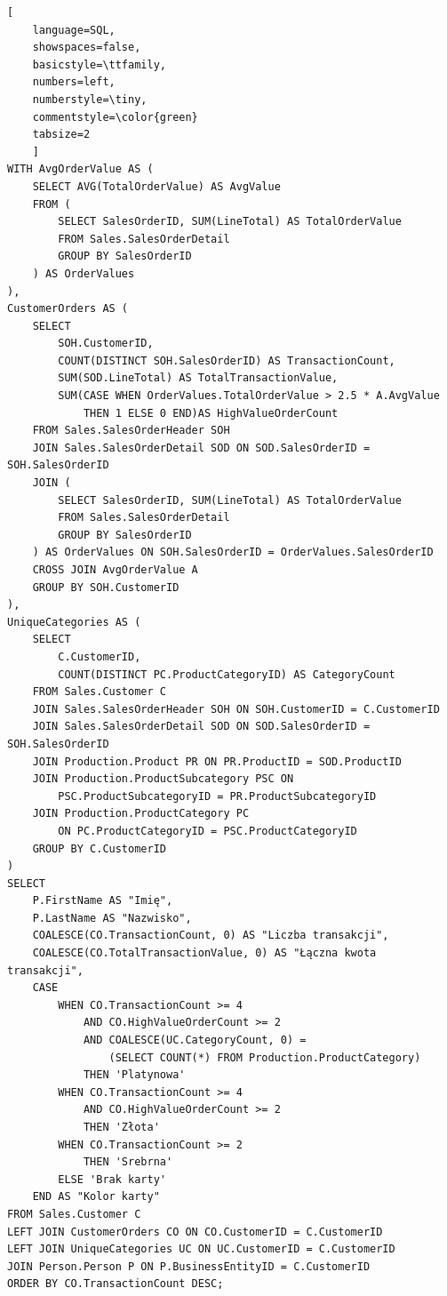 \documentclass[a4paper,12pt]{article}
\begin{document}
\begin{lstlisting}[
    language=SQL,
    showspaces=false,
    basicstyle=\ttfamily,
    numbers=left,
    numberstyle=\tiny,
    commentstyle=\color{green}
    tabsize=2
    ]
WITH AvgOrderValue AS (
    SELECT AVG(TotalOrderValue) AS AvgValue
    FROM (
        SELECT SalesOrderID, SUM(LineTotal) AS TotalOrderValue
        FROM Sales.SalesOrderDetail
        GROUP BY SalesOrderID
    ) AS OrderValues
),
CustomerOrders AS (
    SELECT 
        SOH.CustomerID, 
        COUNT(DISTINCT SOH.SalesOrderID) AS TransactionCount, 
        SUM(SOD.LineTotal) AS TotalTransactionValue, 
        SUM(CASE WHEN OrderValues.TotalOrderValue > 2.5 * A.AvgValue
            THEN 1 ELSE 0 END)AS HighValueOrderCount
    FROM Sales.SalesOrderHeader SOH
    JOIN Sales.SalesOrderDetail SOD ON SOD.SalesOrderID = SOH.SalesOrderID
    JOIN (
        SELECT SalesOrderID, SUM(LineTotal) AS TotalOrderValue
        FROM Sales.SalesOrderDetail
        GROUP BY SalesOrderID
    ) AS OrderValues ON SOH.SalesOrderID = OrderValues.SalesOrderID
    CROSS JOIN AvgOrderValue A 
    GROUP BY SOH.CustomerID
),
UniqueCategories AS (
    SELECT 
        C.CustomerID, 
        COUNT(DISTINCT PC.ProductCategoryID) AS CategoryCount
    FROM Sales.Customer C
    JOIN Sales.SalesOrderHeader SOH ON SOH.CustomerID = C.CustomerID
    JOIN Sales.SalesOrderDetail SOD ON SOD.SalesOrderID = SOH.SalesOrderID
    JOIN Production.Product PR ON PR.ProductID = SOD.ProductID
    JOIN Production.ProductSubcategory PSC ON 
        PSC.ProductSubcategoryID = PR.ProductSubcategoryID
    JOIN Production.ProductCategory PC 
        ON PC.ProductCategoryID = PSC.ProductCategoryID
    GROUP BY C.CustomerID
)
SELECT 
    P.FirstName AS "Imię",
    P.LastName AS "Nazwisko",
    COALESCE(CO.TransactionCount, 0) AS "Liczba transakcji",
    COALESCE(CO.TotalTransactionValue, 0) AS "Łączna kwota transakcji",
    CASE 
        WHEN CO.TransactionCount >= 4 
            AND CO.HighValueOrderCount >= 2 
            AND COALESCE(UC.CategoryCount, 0) = 
                (SELECT COUNT(*) FROM Production.ProductCategory) 
            THEN 'Platynowa'
        WHEN CO.TransactionCount >= 4 
            AND CO.HighValueOrderCount >= 2 
            THEN 'Złota'
        WHEN CO.TransactionCount >= 2 
            THEN 'Srebrna'
        ELSE 'Brak karty'
    END AS "Kolor karty"
FROM Sales.Customer C
LEFT JOIN CustomerOrders CO ON CO.CustomerID = C.CustomerID
LEFT JOIN UniqueCategories UC ON UC.CustomerID = C.CustomerID
JOIN Person.Person P ON P.BusinessEntityID = C.CustomerID
ORDER BY CO.TransactionCount DESC;    
\end{lstlisting}
\end{document}
